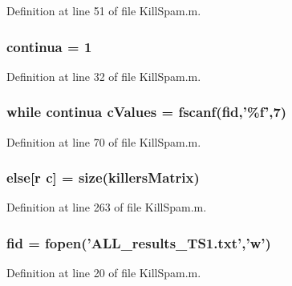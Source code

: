 Definition at line 51 of file Kill\-Spam.\-m.

\hypertarget{a00029_a9c951ebd5bc3f1adce943bee1255f4d6}{
\subsubsection[{continua}]{\setlength{\rightskip}{0pt plus 5cm}continua = 1}}\label{a00029_a9c951ebd5bc3f1adce943bee1255f4d6}


Definition at line 32 of file Kill\-Spam.\-m.

\hypertarget{a00029_ad4ba7701967c1da20171228afccb7081}{
\subsubsection[{c\-Values}]{\setlength{\rightskip}{0pt plus 5cm}while {\bf continua} c\-Values = {\bf fscanf}({\bf fid},'\%{\bf f}',7)}}\label{a00029_ad4ba7701967c1da20171228afccb7081}


Definition at line 70 of file Kill\-Spam.\-m.

\hypertarget{a00029_af5946383720aa572eb93e1e63afc23c2}{
\subsubsection[{else}]{\setlength{\rightskip}{0pt plus 5cm}else\mbox{[}{\bf r} {\bf c}\mbox{]} = {\bf size}({\bf killers\-Matrix})}}\label{a00029_af5946383720aa572eb93e1e63afc23c2}


Definition at line 263 of file Kill\-Spam.\-m.

\hypertarget{a00029_ae9011d40c6f13e68e6f07156e0da7c5d}{
\subsubsection[{fid}]{\setlength{\rightskip}{0pt plus 5cm}fid = fopen('A\-L\-L\-\_\-results\-\_\-\-T\-S1.\-txt','w')}}\label{a00029_ae9011d40c6f13e68e6f07156e0da7c5d}


Definition at line 20 of file Kill\-Spam.\-m.

